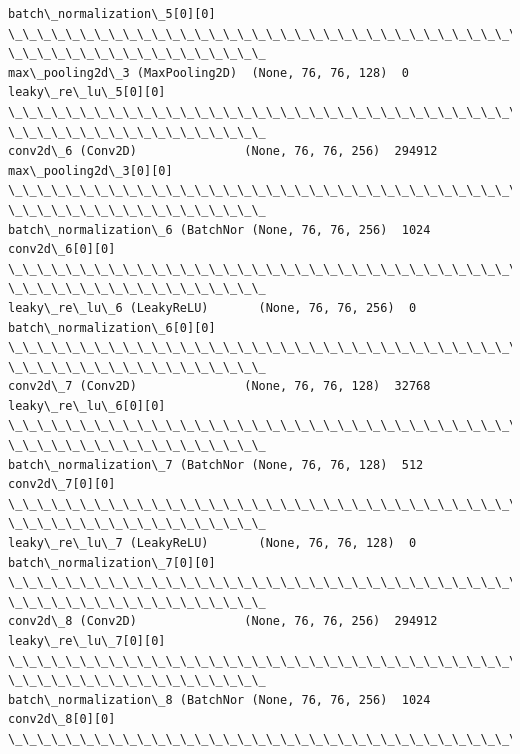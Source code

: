 \documentclass[11pt]{article}
\begin{document}
\begin{Verbatim}[commandchars=\\\{\}]
batch\_normalization\_5[0][0]
\_\_\_\_\_\_\_\_\_\_\_\_\_\_\_\_\_\_\_\_\_\_\_\_\_\_\_\_\_\_\_\_\_\_\_\_\_\_\_\_\_\_\_\_\_\_\_\_\_\_\_\_\_\_\_\_\_\_\_\_\_\_\_\_\_\_\_\_\_\_\_\_\_\_\_\_\_\_\_\_
\_\_\_\_\_\_\_\_\_\_\_\_\_\_\_\_\_\_
max\_pooling2d\_3 (MaxPooling2D)  (None, 76, 76, 128)  0
leaky\_re\_lu\_5[0][0]
\_\_\_\_\_\_\_\_\_\_\_\_\_\_\_\_\_\_\_\_\_\_\_\_\_\_\_\_\_\_\_\_\_\_\_\_\_\_\_\_\_\_\_\_\_\_\_\_\_\_\_\_\_\_\_\_\_\_\_\_\_\_\_\_\_\_\_\_\_\_\_\_\_\_\_\_\_\_\_\_
\_\_\_\_\_\_\_\_\_\_\_\_\_\_\_\_\_\_
conv2d\_6 (Conv2D)               (None, 76, 76, 256)  294912
max\_pooling2d\_3[0][0]
\_\_\_\_\_\_\_\_\_\_\_\_\_\_\_\_\_\_\_\_\_\_\_\_\_\_\_\_\_\_\_\_\_\_\_\_\_\_\_\_\_\_\_\_\_\_\_\_\_\_\_\_\_\_\_\_\_\_\_\_\_\_\_\_\_\_\_\_\_\_\_\_\_\_\_\_\_\_\_\_
\_\_\_\_\_\_\_\_\_\_\_\_\_\_\_\_\_\_
batch\_normalization\_6 (BatchNor (None, 76, 76, 256)  1024        conv2d\_6[0][0]
\_\_\_\_\_\_\_\_\_\_\_\_\_\_\_\_\_\_\_\_\_\_\_\_\_\_\_\_\_\_\_\_\_\_\_\_\_\_\_\_\_\_\_\_\_\_\_\_\_\_\_\_\_\_\_\_\_\_\_\_\_\_\_\_\_\_\_\_\_\_\_\_\_\_\_\_\_\_\_\_
\_\_\_\_\_\_\_\_\_\_\_\_\_\_\_\_\_\_
leaky\_re\_lu\_6 (LeakyReLU)       (None, 76, 76, 256)  0
batch\_normalization\_6[0][0]
\_\_\_\_\_\_\_\_\_\_\_\_\_\_\_\_\_\_\_\_\_\_\_\_\_\_\_\_\_\_\_\_\_\_\_\_\_\_\_\_\_\_\_\_\_\_\_\_\_\_\_\_\_\_\_\_\_\_\_\_\_\_\_\_\_\_\_\_\_\_\_\_\_\_\_\_\_\_\_\_
\_\_\_\_\_\_\_\_\_\_\_\_\_\_\_\_\_\_
conv2d\_7 (Conv2D)               (None, 76, 76, 128)  32768
leaky\_re\_lu\_6[0][0]
\_\_\_\_\_\_\_\_\_\_\_\_\_\_\_\_\_\_\_\_\_\_\_\_\_\_\_\_\_\_\_\_\_\_\_\_\_\_\_\_\_\_\_\_\_\_\_\_\_\_\_\_\_\_\_\_\_\_\_\_\_\_\_\_\_\_\_\_\_\_\_\_\_\_\_\_\_\_\_\_
\_\_\_\_\_\_\_\_\_\_\_\_\_\_\_\_\_\_
batch\_normalization\_7 (BatchNor (None, 76, 76, 128)  512         conv2d\_7[0][0]
\_\_\_\_\_\_\_\_\_\_\_\_\_\_\_\_\_\_\_\_\_\_\_\_\_\_\_\_\_\_\_\_\_\_\_\_\_\_\_\_\_\_\_\_\_\_\_\_\_\_\_\_\_\_\_\_\_\_\_\_\_\_\_\_\_\_\_\_\_\_\_\_\_\_\_\_\_\_\_\_
\_\_\_\_\_\_\_\_\_\_\_\_\_\_\_\_\_\_
leaky\_re\_lu\_7 (LeakyReLU)       (None, 76, 76, 128)  0
batch\_normalization\_7[0][0]
\_\_\_\_\_\_\_\_\_\_\_\_\_\_\_\_\_\_\_\_\_\_\_\_\_\_\_\_\_\_\_\_\_\_\_\_\_\_\_\_\_\_\_\_\_\_\_\_\_\_\_\_\_\_\_\_\_\_\_\_\_\_\_\_\_\_\_\_\_\_\_\_\_\_\_\_\_\_\_\_
\_\_\_\_\_\_\_\_\_\_\_\_\_\_\_\_\_\_
conv2d\_8 (Conv2D)               (None, 76, 76, 256)  294912
leaky\_re\_lu\_7[0][0]
\_\_\_\_\_\_\_\_\_\_\_\_\_\_\_\_\_\_\_\_\_\_\_\_\_\_\_\_\_\_\_\_\_\_\_\_\_\_\_\_\_\_\_\_\_\_\_\_\_\_\_\_\_\_\_\_\_\_\_\_\_\_\_\_\_\_\_\_\_\_\_\_\_\_\_\_\_\_\_\_
\_\_\_\_\_\_\_\_\_\_\_\_\_\_\_\_\_\_
batch\_normalization\_8 (BatchNor (None, 76, 76, 256)  1024        conv2d\_8[0][0]
\_\_\_\_\_\_\_\_\_\_\_\_\_\_\_\_\_\_\_\_\_\_\_\_\_\_\_\_\_\_\_\_\_\_\_\_\_\_\_\_\_\_\_\_\_\_\_\_\_\_\_\_\_\_\_\_\_\_\_\_\_\_\_\_\_\_\_\_\_\_\_\_\_\_\_\_\_\_\_\_

\end{Verbatim}
\end{document}
